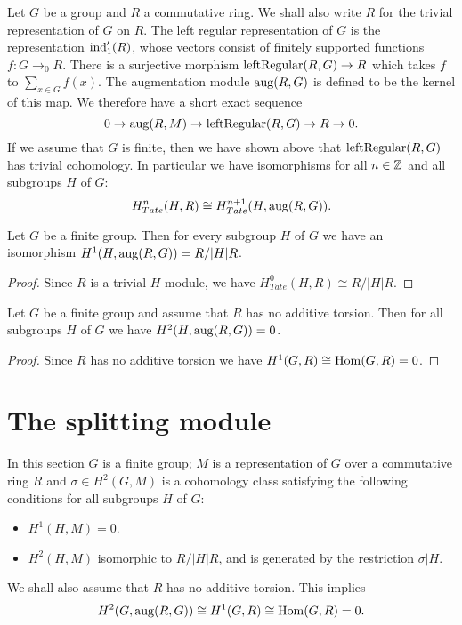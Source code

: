 Let $G$ be a group and $R$ a commutative ring. We shall also write $R$ for the trivial
representation of $G$ on $R$.
The left regular representation of $G$ is the representation $\mathrm{ind}_1'(R)$, whose
vectors consist of finitely supported functions $f : G \to_0 R$.
There is a surjective morphism $\mathrm{leftRegular}(R,G) \to R$ which takes $f$ to $\sum_{x \in G} f(x)$.
The augmentation module $\mathrm{aug}(R,G)$ is defined to be the kernel of this map.
We therefore have a short exact sequence
\[
	0 \to \mathrm{aug}(R,M) \to \mathrm{leftRegular}(R,G) \to R \to 0.
\]
If we assume that $G$ is finite, then we have shown above that $\mathrm{leftRegular}(R,G)$ has
trivial cohomology.
In particular we have isomorphisms for all $n \in {\mathbb Z}$ and all subgroups $H$ of $G$:
\[
	H^n_{Tate}(H,R) \cong H^{n+1}_{Tate}(H,\mathrm{aug}(R,G)).
\]

\begin{lemma}
	Let $G$ be a finite group.
	Then for every subgroup $H$ of $G$ we have an isomorphism $H^1(H,\mathrm{aug}(R,G)) = R / |H| R$.
\end{lemma}

\begin{proof}
	Since $R$ is a trivial $H$-module, we have $H^0_{Tate}(H,R) \cong R / |H| R$.
\end{proof}


\begin{lemma}
	Let $G$ be a finite group and assume that $R$ has no additive torsion.
	Then for all subgroups $H$ of $G$ we have $H^2(H,\mathrm{aug}(R,G)) = 0$.
\end{lemma}

\begin{proof}
	Since $R$ has no additive torsion we have
	$H^1(G,R) \cong \mathrm{Hom}(G,R) = 0$.
\end{proof}




\section{The splitting module}

In this section $G$ is a finite group; $M$ is a representation of $G$ over a commutative ring $R$
 and $\sigma \in H^2(G,M)$ is a cohomology class satisfying the following conditions for all
 subgroups $H$ of $G$:
\begin{itemize}
	\item
	$H^1(H,M)=0$.
	\item
	$H^2(H,M)$ isomorphic to $R / |H|R$, and is generated by the restriction $\sigma | H$.
\end{itemize}
We shall also assume that $R$ has no additive torsion. This implies
\[
	H^2(G,\mathrm{aug}(R,G)) \cong H^1(G,R) \cong \mathrm{Hom}(G,R) = 0.
\]


